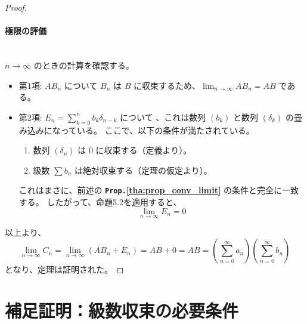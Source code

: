 \documentclass[dvipdfmx,a4paper,11pt]{jsarticle}
\begin{document}
\begin{proof}
\paragraph{極限の評価}\ \\
\noindent
$n \to \infty$ のときの計算を確認する。
\begin{itemize}
    \item 第1項: $A B_n$ について
    $B_n$ は $B$ に収束するため、$\displaystyle\lim_{n \to \infty} A B_n = AB$ である。
    
    \item 第2項: $E_n = \displaystyle\sum_{k=0}^{n} b_k \delta_{n-k}$ について
    、これは数列 $(b_k)$ と数列 $(\delta_k)$ の畳み込みになっている。
    ここで、以下の条件が満たされている。
    \begin{enumerate}
        \item 数列 $(\delta_n)$ は $0$ に収束する（定義より）。
        \item 級数 $\sum b_n$ は絶対収束する（定理の仮定より）。
    \end{enumerate}
    これはまさに、前述の \textbf{\texttt{Prop.}\ref{tha:prop_conv_limit}} の条件と完全に一致する。
    したがって、命題5.2を適用すると、
    \[
    \lim_{n \to \infty} E_n = 0
    \]
\end{itemize}
\noindent
以上より、
\[
\lim_{n \to \infty} C_n = \lim_{n \to \infty} (A B_n + E_n) = AB + 0 = AB = \left(\sum_{n=0}^{\infty} a_n\right) \left(\sum_{n=0}^{\infty} b_n\right)
\]
となり、定理は証明された。
\end{proof}
\newpage
\section{補足証明：級数収束の必要条件} \label{app:nec_condition}
\end{document}

